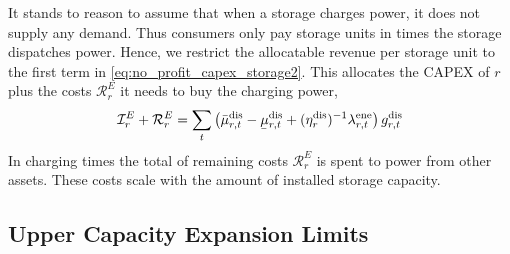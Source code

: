 \documentclass[11pt,twocolumn]{article}
\newcommand{\ubar}[1]{\underaccent{\bar}{#1}}
\newcommand{\pdv}[2]{\frac{\partial #1}{\partial #2}}
\newcommand{\storage}{g_{r,t}}
\newcommand{\storagedispatch}{\storage^\text{dis}}
\newcommand{\storagecharge}{\storage^\text{sto}}
\newcommand{\storagesoc}{\storage^\text{ene}}
\newcommand{\efficiency}{\eta_{r}}
\newcommand{\efficiencydispatch}{\efficiency^\text{dis}}
\newcommand{\efficiencycharge}{\efficiency^\text{sto}}
\newcommand{\efficiencysoc}{\efficiency^\text{ene}}
\newcommand{\operationalpricestorage}{o_r}
\newcommand{\mulowerstoragedispatch}{\ubar{\mu}_{r,t}^\text{dis}}
\newcommand{\muupperstoragedispatch}{\bar{\mu}_{r,t}^\text{dis}}
\newcommand{\mulowerstoragecharge}{\ubar{\mu}_{r,t}^\text{sto}}
\newcommand{\muupperstoragecharge}{\bar{\mu}_{r,t}^\text{sto}}
\newcommand{\mulowerstoragesoc}{\ubar{\mu}_{r,t}^\text{ene}}
\newcommand{\muupperstoragesoc}{\bar{\mu}_{r,t}^\text{ene}}
\newcommand{\mustateofcharge}{\lambda^\text{ene}_{r,t}}
\newcommand{\munextstateofcharge}{\lambda^\text{ene}_{r,t+1}}
\newcommand{\lagrangian}{\mathcal{L}}
\newcommand{\lmp}[1][n]{\lambda_{#1,t}}
\newcommand{\demand}[1][n]{d_{#1,t}}
\newcommand{\cost}{\mathcal{C}}
\newcommand{\capexstorage}{\mathcal{I}^E}
\newcommand{\remainingcost}{\mathcal{R}}
\begin{document}


It stands to reason to assume that when a storage charges power, it does not supply any demand. Thus consumers only pay storage units in times the storage dispatches power. Hence, we restrict the allocatable revenue per storage unit to the first term in \cref{eq:no_profit_capex_storage2}. This allocates the CAPEX of $r$ plus the costs $\remainingcost^E_r$ it needs to buy the charging power, 
\begin{align}
        \capexstorage_r + \remainingcost^E_r = \sum_t \left(\muupperstoragedispatch - \mulowerstoragedispatch  + (\efficiencydispatch )^{-1} \mustateofcharge \right) \storagedispatch 
\end{align} 
In charging times the total of remaining costs $\remainingcost^E_r$ is spent to power from other assets. These costs scale with the amount of installed storage capacity.


\subsection{Upper Capacity Expansion Limits}
\label{sec:upper_capacity_limits}
\end{document}
